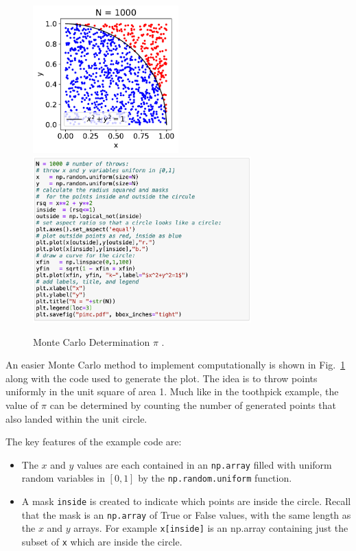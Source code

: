 \begin{figure}[htbp]
\begin{center}
  \includegraphics[width=0.50\textwidth]{figs/monte_carlo/pimc.pdf}
  \includegraphics[width=0.75\textwidth]{figs/monte_carlo/pimc-code.png} 
\caption{Monte Carlo Determination $\pi$ .}
\label{fig:pimc}
\end{center}
\end{figure}

An easier Monte Carlo method to implement computationally is shown in
Fig.~\ref{fig:pimc} along with the code used to generate the plot.
The idea is to throw points uniformly in the unit square of area 1.
Much like in the toothpick example, the value of $\pi$ can be
determined by counting the number of generated points that also landed
within the unit circle.

The key features of the example code are:
\begin{itemize}
\item The $x$ and $y$ values are each contained in an {\tt np.array} filled with uniform random variables in $[0,1]$ by the {\tt np.random.uniform} function.
\item A mask {\tt inside} is created to indicate which points are inside the circle.  Recall that the mask is an {\tt np.array} of True or False values, with the same length as the $x$ and $y$ arrays.  For example {\tt x[inside]} is an np.array containing just the subset of {\tt x} which are inside the circle.  
\end{itemize}

